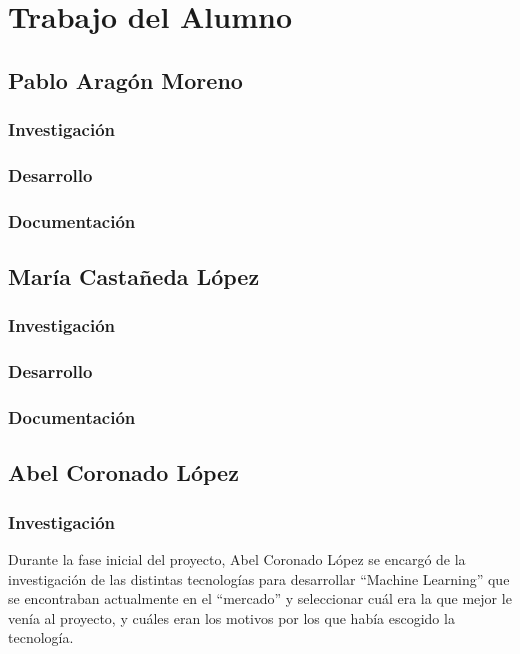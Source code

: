 \cleardoublepage

\chapter{Trabajo del Alumno}
\label{makereference9}

\section{Pablo Aragón Moreno}
\subsection{Investigación}
\subsection{Desarrollo}
\subsection{Documentación}


\section{María Castañeda López}
\subsection{Investigación}
\subsection{Desarrollo}
\subsection{Documentación}


\section{Abel Coronado López}
\subsection{Investigación}

Durante la fase inicial del proyecto, Abel Coronado López se encargó de la investigación de las distintas tecnologías para desarrollar ``Machine Learning'' que se encontraban actualmente en el ``mercado'' y seleccionar cuál era la que mejor le venía al proyecto, y cuáles eran los motivos por los que había escogido la tecnología.

